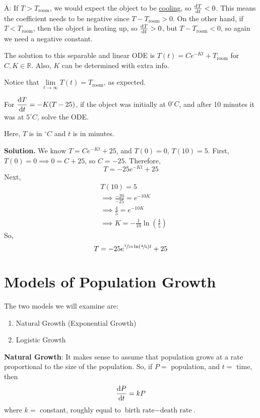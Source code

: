 A\@: If $ T>T_{\text{room}} $, we would expect the object to be \underline{cooling},
so $ \odv{T}{t} <0 $. This means the coefficient needs to be negative since
$ T-T_{\text{room}}>0 $. On the other hand, if $ T<T_{\text{room}} $,
then the object is heating up, so $ \odv{T}{t}>0 $, but
$ T-T_{\text{room}}<0 $, so again we need a negative constant.

\begin{Exercise}{}{}
    The solution to this separable and linear ODE is
    $ \displaystyle  T(t)=Ce^{-Kt}+T_{\text{room}} $
    for $ C,K\in\mathbb{R} $. Also, $ K $ can be determined with extra info.
\end{Exercise}

Notice that $ \lim\limits_{{t} \to {\infty}} T(t)=T_{\text{room}} $,
as expected.

\begin{Example}{}{}
    For
    $ \displaystyle  \odv{T}{t}=-K(T-25)  $,
    if the object was initially at $ 0^\circ C $, and after
    10 minutes it was at $ 5^\circ C $, solve the ODE\@.

    Here,
    $ T $ is in $ ^\circ C $ and $ t $ is in minutes.

    \textbf{Solution.} We know $ T=Ce^{-Kt}+25 $, and $ T(0)=0 $,
    $ T(10)=5 $. First, $ T(0)=0\implies 0=C+25 $, so $ C=-25 $.
    Therefore,
    \[ T=-25e^{-Kt}+25 \]
    Next,
    \begin{align*}
         & T(10)=5                                               \\
         & \implies \frac{-20}{-25} =e^{-10K}                    \\
         & \implies \frac{4}{5} =e^{-10K}                        \\
         & \implies K=-\frac{1}{10}\ln\left( \frac{4}{5} \right)
    \end{align*}
    So,
    \[ T=-25e^{\sfrac{1}{10} \ln\left( \sfrac{4}{5} \right)t}+25 \]
\end{Example}

\section{Models of Population Growth}
The two models we will examine are:
\begin{enumerate}[label=(\Roman*)]
    \item Natural Growth (Exponential Growth)
    \item Logistic Growth
\end{enumerate}
\textbf{Natural Growth}: It makes sense to assume that
population grows at a rate proportional to the size of the population.
So, if $ P= $ population, and $ t= $ time, then
\[ \odv{P}{t}=kP  \]
where $ k= $ constant, roughly equal to $ \text{birth rate}-\text{death rate} $.

